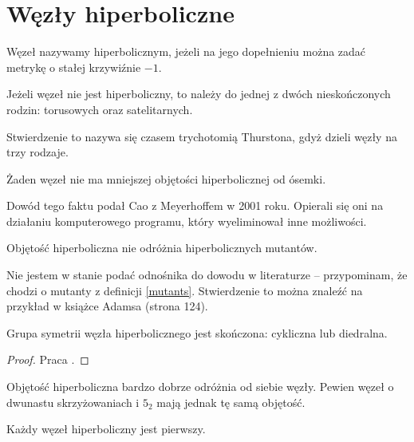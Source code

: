 \section{Węzły hiperboliczne} %
\label{sec:hyperbolic}
\begin{definition}
    Węzeł nazywamy hiperbolicznym, jeżeli na jego dopełnieniu można zadać metrykę o stałej krzywiźnie $-1$. 
\end{definition}

\begin{theorem}[Thurston, 1978]
    Jeżeli węzeł nie jest hiperboliczny, to należy do jednej z dwóch nieskończonych rodzin: torusowych oraz satelitarnych.
\end{theorem}

Stwierdzenie to nazywa się czasem trychotomią Thurstona, gdyż dzieli węzły na trzy rodzaje.

\begin{proposition}
    Żaden węzeł nie ma mniejszej objętości hiperbolicznej od ósemki.
\end{proposition}

Dowód tego faktu podał Cao z Meyerhoffem w 2001 roku.
Opierali się oni na działaniu komputerowego programu, który wyeliminował inne możliwości.

\begin{proposition}
    Objętość hiperboliczna nie odróżnia hiperbolicznych mutantów.
\end{proposition}

Nie jestem w stanie podać odnośnika do dowodu w literaturze -- przypominam, że chodzi o mutanty z definicji \ref{mutants}.
Stwierdzenie to można znaleźć na przykład w książce Adamsa (strona 124).

\begin{proposition}
    Grupa symetrii węzła hiperbolicznego jest skończona: cykliczna lub diedralna.
\end{proposition}

\begin{proof}
    Praca \cite{kodama92}.
\end{proof}

Objętość hiperboliczna bardzo dobrze odróżnia od siebie węzły.
Pewien węzeł o dwunastu skrzyżowaniach i $5_2$ mają jednak tę samą objętość.

\begin{proposition}
    Każdy węzeł hiperboliczny jest pierwszy. 
\end{proposition}

